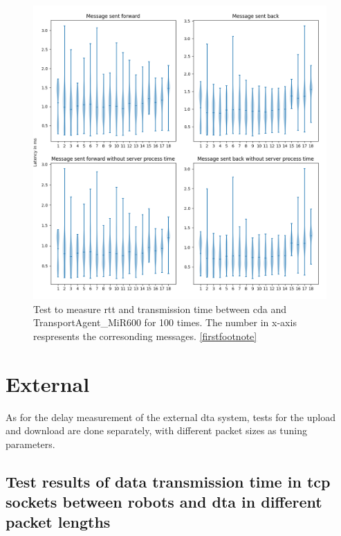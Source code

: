\begin{figure}[htb]
    \centering
    \includegraphics[width=\textwidth]{figures/tests/usecase/violin_CoordinatorAgent_to_TransportAgent_MiR600.png}\hfill 
    \caption{Test to measure \gls{rtt} and transmission time between \gls{cda} and 
    TransportAgent\_MiR600 for 100 times. The number in x-axis respresents the 
    corresonding messages. \protect\ref{firstfootnote}}
    \label{fig: violin-CDA-T600}
\end{figure}




\section{External}\label{chap: Result-External}
As for the delay measurement of the external \gls{dta} system, tests for the 
upload and download are done separately, with different packet sizes as tuning 
parameters. 


\subsection{Test results of data transmission time in \gls{tcp} sockets between robots and \gls{dta} 
in different packet lengths} \label{chap: Result-RCP-DTA}

